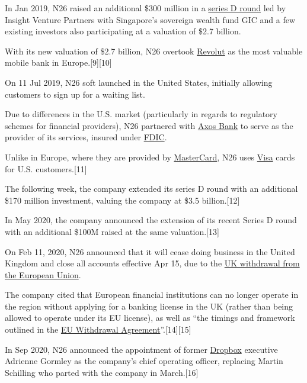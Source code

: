 \documentclass[onsided]{book}
\numberwithin{equation}{section}
\begin{document}
%
In Jan 2019, N26 raised an additional \$300 million in a \href{https://en.wikipedia.org/wiki/Series_D_round}{series D round} led by Insight Venture Partners with Singapore's sovereign wealth fund GIC and a few existing investors also participating at a valuation of \$2.7 billion.

With its new valuation of \$2.7 billion, N26 overtook \href{https://en.wikipedia.org/wiki/Revolut}{Revolut} as the most valuable mobile bank in Europe.[9][10]

%
On 11 Jul 2019, N26 soft launched in the United States, initially allowing customers to sign up for a waiting list.

Due to differences in the U.S. market (particularly in regards to regulatory schemes for financial providers), N26 partnered with \href{https://en.wikipedia.org/wiki/Axos_Bank}{Axos Bank} to serve as the provider of its services, insured under \href{https://en.wikipedia.org/wiki/Federal_Deposit_Insurance_Corporation}{FDIC}.

Unlike in Europe, where they are provided by \href{https://en.wikipedia.org/wiki/Mastercard}{MasterCard}, N26 uses \href{https://en.wikipedia.org/wiki/Visa_Inc.}{Visa} cards for U.S. customers.[11]

The following week, the company extended its series D round with an additional \$170 million investment, valuing the company at \$3.5 billion.[12]

In May 2020, the company announced the extension of its recent Series D round with an additional \$100M raised at the same valuation.[13]

%
On Feb 11, 2020, N26 announced that it will cease doing business in the United Kingdom and close all accounts effective Apr 15, due to the \href{https://en.wikipedia.org/wiki/Brexit}{UK withdrawal from the European Union}.

The company cited that European financial institutions can no longer operate in the region without applying for a banking license in the UK (rather than being allowed to operate under its EU license), as well as ``the timings and framework outlined in the \href{https://en.wikipedia.org/wiki/Brexit_withdrawal_agreement}{EU Withdrawal Agreement}''.[14][15]

%
In Sep 2020, N26 announced the appointment of former \href{https://en.wikipedia.org/wiki/Dropbox_(service)}{Dropbox} executive Adrienne Gormley as the company's chief operating officer, replacing Martin Schilling who parted with the company in March.[16]
\end{document}
